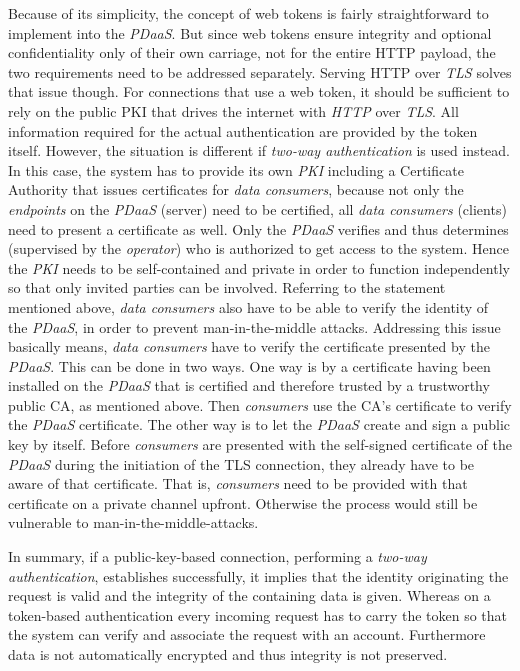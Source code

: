 \documentclass[12pt,english,a4paper,titlepage,cleardoublepage=empty,dottedtoc]{report}
\begin{document}
Because of its simplicity, the concept of web tokens is fairly
straightforward to implement into the \emph{PDaaS}. But since web tokens
ensure integrity and optional confidentiality only of their own
carriage, not for the entire HTTP payload, the two requirements need to
be addressed separately. Serving HTTP over \emph{TLS} solves that issue
though. For connections that use a web token, it should be sufficient to
rely on the public PKI that drives the internet with \emph{HTTP} over
\emph{TLS}. All information required for the actual authentication are
provided by the token itself. However, the situation is different if
\emph{two-way authentication} is used instead. In this case, the system
has to provide its own \emph{PKI} including a Certificate Authority that
issues certificates for \emph{data consumers}, because not only the
\emph{endpoints} on the \emph{PDaaS} (server) need to be certified, all
\emph{data consumers} (clients) need to present a certificate as well.
Only the \emph{PDaaS} verifies and thus determines (supervised by the
\emph{operator}) who is authorized to get access to the system. Hence
the \emph{PKI} needs to be self-contained and private in order to
function independently so that only invited parties can be involved.
Referring to the statement mentioned above, \emph{data consumers} also
have to be able to verify the identity of the \emph{PDaaS}, in order to
prevent man-in-the-middle attacks. Addressing this issue basically
means, \emph{data consumers} have to verify the certificate presented by
the \emph{PDaaS}. This can be done in two ways. One way is by a
certificate having been installed on the \emph{PDaaS} that is certified
and therefore trusted by a trustworthy public CA, as mentioned above.
Then \emph{consumers} use the CA's certificate to verify the
\emph{PDaaS} certificate. The other way is to let the \emph{PDaaS}
create and sign a public key by itself. Before \emph{consumers} are
presented with the self-signed certificate of the \emph{PDaaS} during
the initiation of the TLS connection, they already have to be aware of
that certificate. That is, \emph{consumers} need to be provided with
that certificate on a private channel upfront. Otherwise the process
would still be vulnerable to man-in-the-middle-attacks.

In summary, if a public-key-based connection, performing a \emph{two-way
authentication}, establishes successfully, it implies that the identity
originating the request is valid and the integrity of the containing
data is given. Whereas on a token-based authentication every incoming
request has to carry the token so that the system can verify and
associate the request with an account. Furthermore data is not
automatically encrypted and thus integrity is not preserved.
\end{document}
